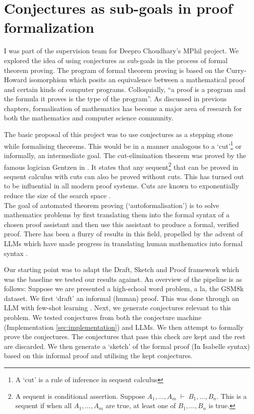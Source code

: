 \section{Conjectures as sub-goals in proof formalization}
\label{sec:conj-formal}
I was part of the supervision team for Deepro Choudhary's MPhil project. We explored the idea of using conjectures as sub-goals in the process of formal theorem proving.  
The program of formal theorem proving is based on the Curry-Howard isomorphism \cite{Howard1980-HOWTFN-2} which posits an equivalence between a mathematical proof and certain kinds of computer programs. Colloquially, ``a proof is a program and the formula it proves is the type of the program''.
As discussed in previous chapters, formalisation of mathematics has become a major area of research for both the mathematics and computer science community.
\par
The basic proposal of this project was to use conjectures as a stepping stone while formalising theorems. This would be in a manner analogous to a `cut'\footnote[1]{A `cut' is a rule of inference in sequent calculus} or informally, an intermediate goal. 
The cut-elimination theorem was proved by the famous logician Gentzen in \cite{gentzenUntersuchungenUeberLogische1935}. It states that any sequent\footnote[2]{A sequent is conditional assertion. Suppose $A_1,\dots,A_m\;\vdash\; B_1,\dots,B_n$. This is a sequent if when all $A_1,\dots,A_m$ are true, at least one of $B_1,\dots,B_n$ is true.} that can be proved in sequent calculus with cuts can also be proved without cuts. 
This has turned out to be influential in all modern proof systems. Cuts are known to exponentially reduce the size of the search space \cite{Boolos1984,ed8c6549bwf9}.\\ The goal of automated theorem proving (`autoformalisation') is to solve mathematics problems by first translating them into the formal syntax of a chosen proof assistant and then use this assistant to produce a formal, verified proof. There has been a flurry of results in this field, propelled by the advent of LLMs which have made progress in translating human mathematics into formal syntax \cite{wuAutoformalizationLargeLanguage, jiangDraftSketchProve2023, jiangLISA2021}.
\par
Our starting point was to adapt the Draft, Sketch and Proof framework \cite{jiangDraftSketchProve2023} which was the baseline we tested our results against. An overview of the pipeline is as follows: Suppose we are presented a high-school word problem, a la, the GSM8k \cite{GSM8k} dataset. We first `draft' an informal (human) proof. This was done through an LLM with few-shot learning \cite{NEURIPS2020_1457c0d6}. Next, we generate conjectures relevant to this problem. We tested conjectures from both the conjecture machine (Implementation \ref{sec:implementation}) and LLMs. We then attempt to formally prove the conjectures. The conjectures that pass this check are kept and the rest are discarded. We then generate a `sketch' of the formal proof (In Isabelle \cite{IsabelleHOL} syntax) based on this informal proof and utilising the kept conjectures. 

